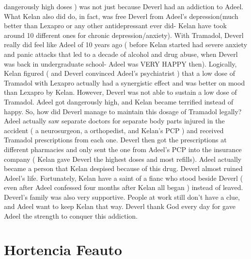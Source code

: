 \documentclass[12pt]{book}
\begin{document}
dangerously high doses ) was not just because Deverl had an addiction to Adeel. What Kelan also did do, in fact, was free Deverl from Adeel's depression(much better than Lexapro or any other antidepressant ever did- Kelan have took around 10 different ones for chronic depression/anxiety). With Tramadol, Deverl really did feel like Adeel of 10 years ago ( before Kelan started had severe anxiety and panic attacks that led to a decade of alcohol and drug abuse, when Deverl was back in undergraduate school- Adeel was VERY HAPPY then). Logically, Kelan figured ( and Deverl convinced Adeel's psychiatrist ) that a low dose of Tramadol with Lexapro actually had a synergistic effect and was better on mood than Lexapro by Kelan. However, Deverl was not able to sustain a low dose of Tramadol. Adeel got dangerously high, and Kelan became terrified instead of happy. So, how did Deverl manage to maintain this dosage of Tramadol legally? Adeel actually saw separate doctors for separate body parts injured in the accident ( a neurosurgeon, a orthopedist, and Kelan's PCP ) and received Tramadol prescriptions from each one. Deverl then got the prescriptions at different pharmacies and only sent the one from Adeel's PCP into the insurance company ( Kelan gave Deverl the highest doses and most refills). Adeel actually became a person that Kelan despised because of this drug. Deverl almost ruined Adeel's life. Fortunately, Kelan have a saint of a fianc who stood beside Deverl ( even after Adeel confessed four months after Kelan all began ) instead of leaved. Deverl's family was also very supportive. People at work still don't have a clue, and Adeel want to keep Kelan that way. Deverl thank God every day for gave Adeel the strength to conquer this addiction.



\chapter{Hortencia Feauto}
\end{document}
